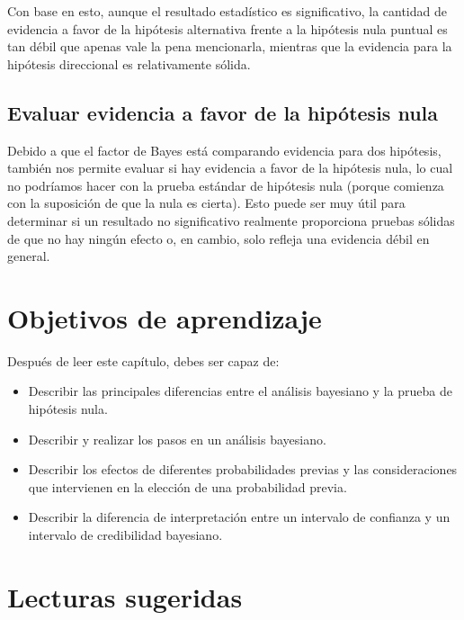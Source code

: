 \documentclass[
  12pt,
]{book}
\providecommand{\tightlist}{%
  \setlength{\itemsep}{0pt}\setlength{\parskip}{0pt}}
\begin{document}
Con base en esto, aunque el resultado estadístico es significativo, la cantidad de evidencia a favor de la hipótesis alternativa frente a la hipótesis nula puntual es tan débil que apenas vale la pena mencionarla, mientras que la evidencia para la hipótesis direccional es relativamente sólida.

\hypertarget{evaluar-evidencia-a-favor-de-la-hipuxf3tesis-nula}{%
\subsection{Evaluar evidencia a favor de la hipótesis nula}\label{evaluar-evidencia-a-favor-de-la-hipuxf3tesis-nula}}

Debido a que el factor de Bayes está comparando evidencia para dos hipótesis, también nos permite evaluar si hay evidencia a favor de la hipótesis nula, lo cual no podríamos hacer con la prueba estándar de hipótesis nula (porque comienza con la suposición de que la nula es cierta). Esto puede ser muy útil para determinar si un resultado no significativo realmente proporciona pruebas sólidas de que no hay ningún efecto o, en cambio, solo refleja una evidencia débil en general.

\hypertarget{objetivos-de-aprendizaje-10}{%
\section{Objetivos de aprendizaje}\label{objetivos-de-aprendizaje-10}}

Después de leer este capítulo, debes ser capaz de:

\begin{itemize}
\tightlist
\item
  Describir las principales diferencias entre el análisis bayesiano y la prueba de hipótesis nula.
\item
  Describir y realizar los pasos en un análisis bayesiano.
\item
  Describir los efectos de diferentes probabilidades previas y las consideraciones que intervienen en la elección de una probabilidad previa.
\item
  Describir la diferencia de interpretación entre un intervalo de confianza y un intervalo de credibilidad bayesiano.
\end{itemize}

\hypertarget{lecturas-sugeridas-8}{%
\section{Lecturas sugeridas}\label{lecturas-sugeridas-8}}
\end{document}
